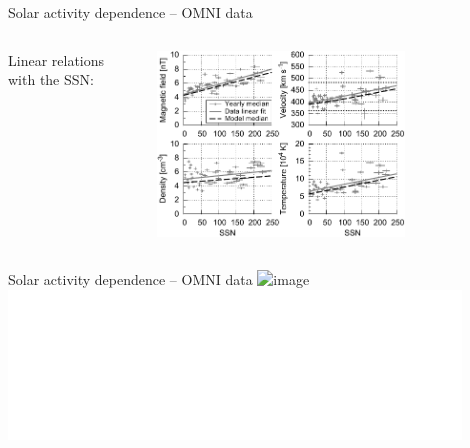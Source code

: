 % 		
% 
% 		
% 		
% 		
\begin{frame}[plain,c]{Solar activity dependence -- OMNI data}{}
	\begin{columns}[c]
	\column{\textwidth}
		
		\centering
		Linear relations with the SSN:\\\ 
		
		\includegraphics[width=0.7\textwidth]{../figures_paper/OMNI_yearly_BVNTvsSSN_a.pdf}
	\end{columns}
	\vspace*{\fill} \hfill \hyperlink{time_lag}{\beamerskipbutton{}}
\end{frame}
\begin{frame}[plain,t]{Solar activity dependence -- OMNI data}{}
	\centering
	\includegraphics<1>[width=0.45\textwidth]{../talk_figures/sw_ssn_bfield.png}
	\includegraphics<2>[width=0.9\textwidth]{../figures_paper/OMNI_yearly_BVdblNTSSN_fit_e_plot.pdf}
\end{frame}
